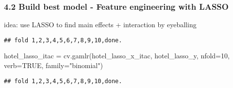 \documentclass[
]{article}
\newenvironment{Shaded}{\begin{snugshade}}{\end{snugshade}}
\newcommand{\AttributeTok}[1]{\textcolor[rgb]{0.77,0.63,0.00}{#1}}
\newcommand{\CommentTok}[1]{\textcolor[rgb]{0.56,0.35,0.01}{\textit{#1}}}
\newcommand{\ConstantTok}[1]{\textcolor[rgb]{0.00,0.00,0.00}{#1}}
\newcommand{\DecValTok}[1]{\textcolor[rgb]{0.00,0.00,0.81}{#1}}
\newcommand{\FunctionTok}[1]{\textcolor[rgb]{0.00,0.00,0.00}{#1}}
\newcommand{\NormalTok}[1]{#1}
\newcommand{\OtherTok}[1]{\textcolor[rgb]{0.56,0.35,0.01}{#1}}
\newcommand{\SpecialCharTok}[1]{\textcolor[rgb]{0.00,0.00,0.00}{#1}}
\newcommand{\StringTok}[1]{\textcolor[rgb]{0.31,0.60,0.02}{#1}}
\begin{document}
\hypertarget{build-best-model---feature-engineering-with-lasso}{%
\subsubsection{4.2 Build best model - Feature engineering with
LASSO}\label{build-best-model---feature-engineering-with-lasso}}

idea: use LASSO to find main effects + interaction by eyeballing

\begin{Shaded}
\end{Shaded}

\begin{verbatim}
## fold 1,2,3,4,5,6,7,8,9,10,done.
\end{verbatim}

\begin{Shaded}
\begin{Highlighting}[]
\NormalTok{hotel\_lasso\_itac }\OtherTok{=} \FunctionTok{cv.gamlr}\NormalTok{(hotel\_lasso\_x\_itac, hotel\_lasso\_y, }\AttributeTok{nfold=}\DecValTok{10}\NormalTok{, }\AttributeTok{verb=}\ConstantTok{TRUE}\NormalTok{, }\AttributeTok{family=}\StringTok{"binomial"}\NormalTok{)}
\end{Highlighting}
\end{Shaded}

\begin{verbatim}
## fold 1,2,3,4,5,6,7,8,9,10,done.
\end{verbatim}
\end{document}
